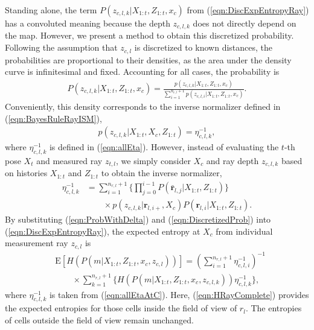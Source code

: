 \documentclass[letterpaper, 10pt]{ieeeconf}
\newcommand{\refeqn}[1]{(\ref{eqn:#1})}
\begin{document}
Standing alone, the term $P(z_{c,l,k}|X_{1:t},Z_{1:t},x_c)$ from \refeqn{DiscExpEntropyRay} has a convoluted meaning because the depth $z_{c,l,k}$ does not directly depend on the map. However, we present a method to obtain this discretized probability. %
Following the assumption that $z_{c,l}$ is discretized to known distances, the probabilities are proportional to their densities, as the area under the density curve is infinitesimal and fixed. Accounting for all cases, the probability is
\begin{align}
\label{eqn:ProbWithDelta}
P(z_{c,l,k}|X_{1:t},Z_{1:t},x_c)=\frac{p(z_{c,l,k}|X_{1:t},Z_{1:t},x_c)}{\sum_{i=1}^{n_{r,l}+1}p(z_{c,l,i}|X_{1:t},Z_{1:t},x_c)}.
\end{align}
Conveniently, this density corresponds to the inverse normalizer defined in \refeqn{BayesRuleRayISM},
\begin{align}
\label{eqn:DiscretizedProb}
p(z_{c,l,k}|X_{1:t},X_c,Z_{1:t})=\eta_{c,l,k}^{-1},
\end{align}
where $\eta_{c,l,k}^{-1}$ is defined in \refeqn{allEta}. However, instead of evaluating the $t$-th pose $X_t$ and measured ray $z_{t,l}$, we simply consider $X_c$ and ray depth $z_{c,l,k}$ based on histories $X_{1:t}$ and $Z_{1:t}$ to obtain the inverse normalizer,
\begin{align}
\label{eqn:allEtaAtC}
\eta_{c,l,k}^{-1}
&=
\sum_{i=1}^{n_{r,l}+1}\bigg\{\prod_{j=0}^{i-1}P(\bar{\mathbf{r}}_{l,j}|X_{1:t},Z_{1:t})\bigg\}\nonumber\\&\qquad\times p(z_{c,l,k}|\mathbf{r}_{l,i+},X_c)P(\mathbf{r}_{l,i}|X_{1:t},Z_{1:t}).
\end{align}
By substituting \refeqn{ProbWithDelta} and \refeqn{DiscretizedProb} into \refeqn{DiscExpEntropyRay}, the expected entropy at $X_c$ from individual measurement ray $z_{c,l}$ is
\begin{align}
\label{eqn:HRayComplete}
&\text{E}[H(P(m|X_{1:t},Z_{1:t},x_c,z_{c,l}))]=\left(\sum_{i=1}^{n_{r,l}+1}\eta_{c,l,i}^{-1}\right)^{-1}\nonumber\\&\quad\quad\times\sum_{k=1}^{n_{r,l}+1}\bigg\{H(P(m|X_{1:t},Z_{1:t},x_c,z_{c,l,k}))\eta_{c,l,k}^{-1}\bigg\},
\end{align}
where $\eta_{c,l,k}^{-1}$ is taken from \refeqn{allEtaAtC}.
Here, \refeqn{HRayComplete} provides the expected entropies for those cells inside the field of view of $r_l$. %
The entropies of cells outside the field of view remain unchanged.
\end{document}
